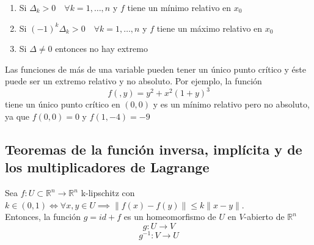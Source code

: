 \begin{teorema}
    \begin{enumerate}
        \item Si $\Delta_k > 0 \quad \forall k = 1, \ldots, n$ y $f$ tiene un mínimo relativo en $x_0$ 
        \item Si $(-1)^k \Delta_k > 0 \quad \forall k = 1, \ldots, n$ y $f$ tiene un máximo relativo en $x_0$
        \item Si $\Delta \neq 0$ entonces no hay extremo
    \end{enumerate}
\end{teorema}

\begin{observación}
    Las funciones de más de una variable pueden tener un único punto crítico y éste puede ser un extremo relativo y no absoluto. Por ejemplo, la función $$f(,y) =y^2 +x^2(1+ y)^3$$
    tiene un único punto crítico en $(0, 0)$ y es un mínimo relativo pero no absoluto, ya que $f(0,0) = 0$ y $f(1, -4) = -9$
\end{observación}

\subsection{Teoremas de la función inversa, implícita y de los multiplicadores de Lagrange}

\begin{proposición}
    Sea $f: U \subset \mathbb{R}^n \to \mathbb{R}^n$ k-lipschitz con $k \in (0,1) \iff \forall x, y \in U \implies \|f(x) - f(y)\| \leq k \|x - y\|$. \\
    Entonces, la función $g = id +f$ es un homeomorfismo de $U$ en $V$-abierto de $\mathbb{R}^n$
    $$g: U \to V$$
    $$g^{-1}: V \to U$$
\end{proposición}

